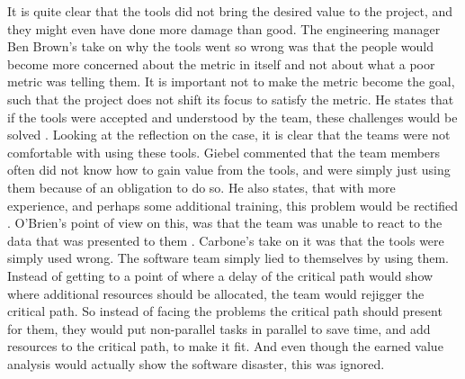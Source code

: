 It is quite clear that the tools did not bring the desired value to the project, and they might even have done more damage than good.
The engineering manager Ben Brown's take on why the tools went so wrong was that the people would become more concerned about the metric in itself and not about what a poor metric was telling them. It is important not to make the metric become the goal, such that the project does not shift its focus to satisfy the metric. He states that if the tools were accepted and understood by the team, these challenges would be solved \cite[p. 12]{GinoPisano2005}.
Looking at the reflection on the case, it is clear that the teams were not comfortable with using these tools. Giebel commented that the team members often did not know how to gain value from the tools, and were simply just using them because of an obligation to do so. He also states, that with more experience, and perhaps some additional training, this problem would be rectified \cite[p. 11]{GinoPisano2005}.
O'Brien's point of view on this, was that the team was unable to react to the data that was presented to them \cite[p. 11]{GinoPisano2005}.
Carbone's take on it was that the tools were simply used wrong. The software team simply lied to themselves by using them. Instead of getting to a point of where a delay of the critical path would show where additional resources should be allocated, the team would rejigger the critical path. So instead of facing the problems the critical path should present for them, they would put non-parallel tasks in parallel to save time, and add resources to the critical path, to make it fit. And even though the earned value analysis would actually show the software disaster, this was ignored. \cite[p. 11]{GinoPisano2005}

